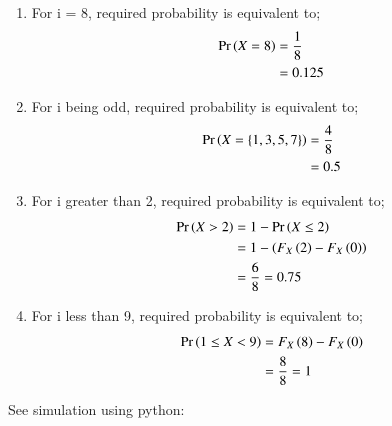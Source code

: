 \documentclass[journal,12pt,twocolumn]{IEEEtran}
\begin{document}
\begin{enumerate}[label=(\roman*)]
\item 
For i = 8, required probability is equivalent to;
\begin{align}
    \Pr\left(X=8\right) &= \frac{1}{8}\\
    &= 0.125
\end{align}
\item 
For i being odd, required probability is equivalent to;
\begin{align}
    \Pr\left(X=\left\{1,3,5,7\right\}\right) &= \frac{4}{8}\\
    &= 0.5
\end{align}

\item 
For i greater than 2, required probability is equivalent to;
\begin{align}
    \Pr\left(X > 2\right) &= 1 - \Pr\left(X \le 2\right)\\
    &= 1 - \left(F_{X}\left(2\right)-F_{X}\left(0\right)\right)\\
    &= \frac{6}{8}= 0.75
\end{align}

\item 
For i less than 9, required probability is equivalent to;
\begin{align}
    \Pr\left(1 \le X < 9\right) &= F_{X}\left(8\right)-F_{X}\left(0\right)\\
    &= \frac{8}{8}= 1
\end{align}

\end{enumerate}
See simulation using python:\cite{simulation}

\end{document}
